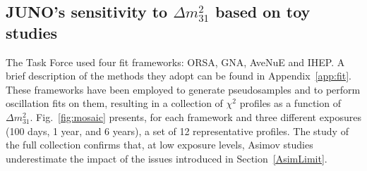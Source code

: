 
\subsection{JUNO's sensitivity to $\Delta m^2_{31}$ based on toy studies}\label{sec:senswithtoy}

The Task Force used four fit frameworks: ORSA, GNA, AveNuE and IHEP. A brief description of the methods they adopt can be found in Appendix~\ref{app:fit}.
These frameworks have been employed to generate pseudosamples and to perform oscillation fits on them, resulting in a collection of
$\chi^2$ profiles as a function of $\Delta m^2_{31}$. Fig.~\ref{fig:mosaic} presents, for each framework and three different exposures (100 days, 1 year, and 6 years), a set of 12 representative profiles. The study of the full collection confirms that, at low exposure levels, Asimov studies underestimate the impact of the issues introduced in Section~\ref{AsimLimit}.

